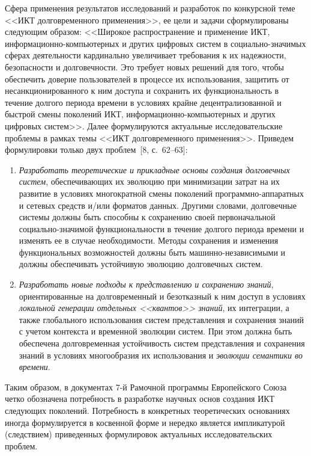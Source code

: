 \begin{multicols}{2}
      Сфера применения результатов исследований и раз\-ра\-бо\-ток по конкурсной теме <<ИКТ
дол\-го\-временно\-го применения>>, ее цели и задачи сфор\-мули\-ро\-ва\-ны следующим образом:
<<Широкое распро\-стра\-не\-ние и применение ИКТ, ин\-фор\-ма\-ци\-он\-но-ком\-пью\-тер\-ных и других
цифровых систем в со\-ци\-аль\-но-зна\-чи\-мых сферах деятельности кардинально увеличивает
требования к их надежности, безопасности и долговечности. Это требует новых решений для
того, чтобы обеспечить доверие пользователей в процессе их использования, защитить от
несанкционированного к ним доступа и сохранить их функциональность в течение долгого
периода времени в условиях крайне децентрализованной и быстрой смены поколений ИКТ,
ин\-фор\-ма\-ци\-он\-но-ком\-пью\-тер\-ных и других цифровых систем>>. Далее формулируются
актуальные исследовательские проблемы в рамках темы <<ИКТ долговременного
применения>>. Приведем формулировки только двух проблем~[8, с.~62--63]:
      \begin{enumerate}[(1)]
      \item \textit{Разработать теоретические и прикладные основы создания долговечных
систем}, обеспечивающих их эволюцию при минимизации затрат на их развитие в условиях
многократной смены поколений программно-аппаратных и сетевых средств и/или форматов
данных. Другими словами, долговечные системы должны быть способны к сохранению своей
первоначальной социально-значимой функциональности в течение долгого периода времени и
изменять ее в случае необходимости. Методы сохранения и изменения функциональных
возможностей должны быть машинно-независимыми и должны обеспечивать устойчивую
эволюцию долговечных систем.
      \item \textit{Разработать новые подходы к представлению и сохранению знаний},
ориентированные на долговременный и безотказный к ним доступ в условиях \textit{локальной
генерации отдельных <<квантов>> знаний}, их интеграции, а также глобального
использования систем представления и сохранения знаний с учетом контекста и временной
эволюции систем. При этом должна быть обеспечена долговременная устойчивость систем
представления и сохранения знаний в условиях многообразия их использования и
\textit{эволюции семантики во времени}.
      \end{enumerate}

      Таким образом, в документах 7-й Рамочной программы Европейского Союза четко
обозначена потребность в разработке научных основ создания ИКТ следующих поколений.
Потребность в конкретных теоретических основаниях иногда формулируется в косвенной
форме и нередко является импликатурой (следствием) приведенных формулировок актуальных
исследовательских проблем.


\end{multicols}
